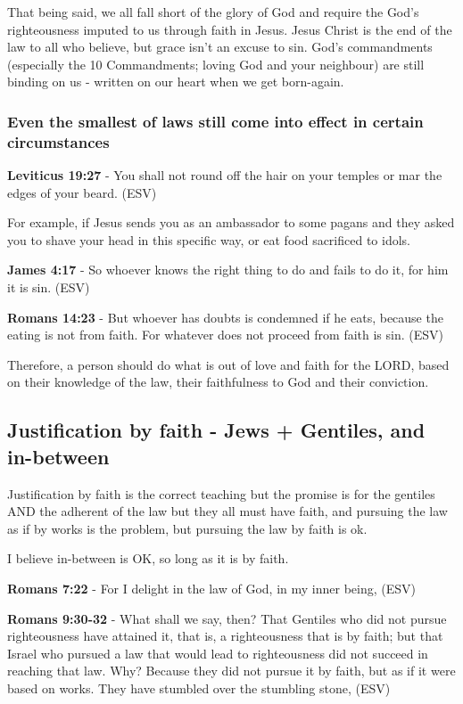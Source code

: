 \documentclass[11pt]{article}
\begin{document}
That being said, we all fall short of the glory of God and require the God's righteousness imputed to us through faith in Jesus.
Jesus Christ is the end of the law to all who believe, but grace isn't an excuse to sin.
God's commandments (especially the 10 Commandments; loving God and your neighbour) are still binding on us - written on our heart when we get born-again.

\subsubsection{Even the smallest of laws still come into effect in certain circumstances}
\label{sec:org0467cf0}

\textbf{Leviticus 19:27} - You shall not round off the hair on your temples or mar the edges of your beard. (ESV)

For example, if Jesus sends you as an ambassador to some pagans and they asked you to shave your head in this specific way, or eat food sacrificed to idols.

\textbf{James 4:17} -  So whoever knows the right thing to do and fails to do it, for him it is sin.  (ESV)

\textbf{Romans 14:23} - But whoever has doubts is condemned if he eats, because the eating is not from faith. For whatever does not proceed from faith is sin. (ESV)

Therefore, a person should do what is out of love and faith for the LORD, based on their knowledge of the law,
their faithfulness to God and their conviction.

\subsection{Justification by faith - Jews + Gentiles, and in-between}
\label{sec:org342df46}
Justification by faith is the correct teaching but the promise is for the gentiles AND the adherent of the law but they all must have faith, and pursuing the law as if by works is the problem, but pursuing the law by faith is ok.

I believe in-between is OK, so long as it is by faith.

\textbf{Romans 7:22} - For I delight in the law of God, in my inner being, (ESV)

\textbf{Romans 9:30-32} - What shall we say, then? That Gentiles who did not pursue righteousness have attained it, that is, a righteousness that is by faith; but that Israel who pursued a law that would lead to righteousness did not succeed in reaching that law. Why? Because they did not pursue it by faith, but as if it were based on works. They have stumbled over the stumbling stone, (ESV)
\end{document}
